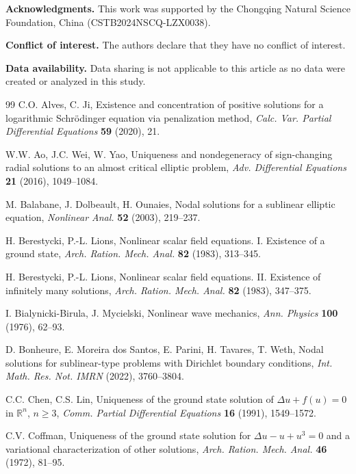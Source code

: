 \documentclass[11pt]{article}
\begin{document}
\vspace{.3cm}

\noindent\textbf{Acknowledgments.}
This work was supported by the Chongqing Natural Science Foundation, China
(CSTB2024NSCQ-LZX0038).

\medskip

\noindent\textbf{Conflict of interest.}
The authors declare that they have no conflict of interest.

\medskip
\noindent\textbf{Data availability.}
Data sharing is not applicable to this article as no data were created or analyzed in this study.

\begin{thebibliography}{99}
C.O. Alves, C. Ji,
Existence and concentration of positive solutions for a logarithmic Schr\"{o}dinger equation via penalization method,
\emph{Calc. Var. Partial Differential Equations} \textbf{59} (2020), {21}.

W.W. Ao, J.C. Wei, W. Yao,
Uniqueness and nondegeneracy of sign-changing radial solutions to an almost critical elliptic problem,
\emph{Adv. Differential Equations} \textbf{21} (2016), 1049--1084.

 M. Balabane, J. Dolbeault, H. Ounaies,
Nodal solutions for a sublinear elliptic equation,
\emph{Nonlinear Anal.} \textbf{52} (2003), 219--237.

 H. Berestycki, P.-L. Lions,
Nonlinear scalar field equations. I. Existence of a ground state,
\emph{Arch. Ration. Mech. Anal.} \textbf{82} (1983), 313--345.

 H. Berestycki, P.-L. Lions,
Nonlinear scalar field equations. {II\@.} Existence of infinitely many solutions,
\emph{Arch. Ration. Mech. Anal.} \textbf{82} (1983), 347--375.

 I. Bialynicki-Birula, J. Mycielski,
Nonlinear wave mechanics,
\emph{Ann. Physics} \textbf{100} (1976), 62--93.

D. Bonheure, E. Moreira dos Santos, E. Parini, H. Tavares, T. Weth,
Nodal solutions for sublinear-type problems with Dirichlet boundary
conditions,
\emph{Int. Math. Res. Not. IMRN} (2022), 3760--3804.


 C.C. Chen, C.S. Lin,
{Uniqueness of the ground state solution of $\Delta u+f(u)=0$ in $\mathbb R^n$, $n\ge3$,}
\emph{Comm. Partial Differential Equations} \textbf{16} (1991), 1549--1572.

 C.V. Coffman,
Uniqueness of the ground state solution for $\Delta u-u+u^3=0$ and a variational characterization of other solutions,
\emph{Arch. Ration. Mech. Anal.} \textbf{46} (1972), 81--95.


\end{thebibliography}
\end{document}
